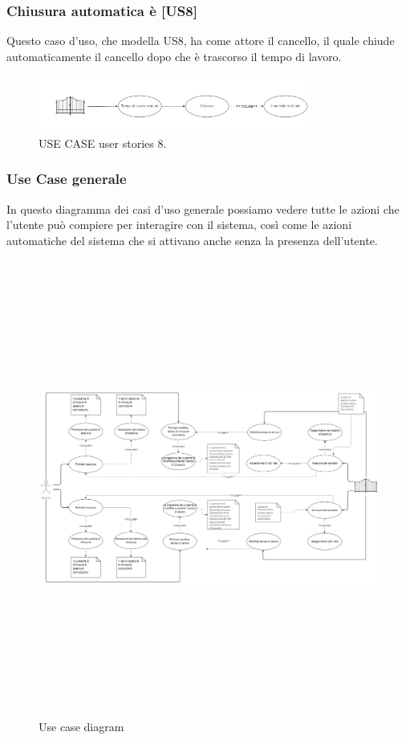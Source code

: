 \documentclass[12pt]{article}
\begin{document}
\subsubsection{Chiusura automatica è [US8]}
Questo caso d'uso, che modella US8, ha come attore il cancello, il quale chiude automaticamente il cancello dopo che è trascorso il tempo di lavoro.
    \begin{figure}[h]
        \centering
        \includegraphics[width=0.8\textwidth]{use_case_us8.PNG}
        \caption{USE CASE user stories 8.}
        \label{fig:use_case_us8}
    \end{figure}

\newpage
\subsubsection{Use Case generale}
In questo diagramma dei casi d'uso generale possiamo vedere tutte le azioni che l'utente può compiere per interagire con il sistema, così come le azioni automatiche del sistema che si attivano anche senza la presenza dell'utente.
\begin{figure}[h] %
    \centering %
    \includegraphics[width=1.1\textwidth, height=15cm, angle=270]{usa_case_diagram.PNG} %
    \caption{Use case diagram} %
    \label{fig:immagine} %
\end{figure}
\end{document}
